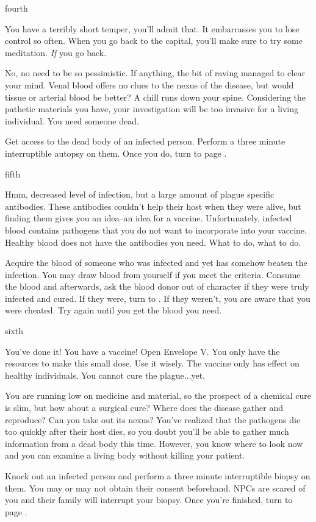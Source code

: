 \documentclass[greennotebook]{Pestilence} %
\begin{document}
\begin{page}{fourth}

You have a terribly short temper, you'll admit that. It embarrasses you to lose control so often. When you go back to the capital, you'll make sure to try some meditation. \textit{If} you go back.

No, no need to be so pessimistic. If anything, the bit of raving managed to clear your mind. Venal blood offers no clues to the nexus of the disease, but would tissue or arterial blood be better? A chill runs down your spine. Considering the pathetic materials you have, your investigation will be too invasive for a living individual. You need someone dead.

Get access to the dead body of an infected person. Perform a three minute interruptible autopsy on them. Once you do, turn to page .

\end{page}

\begin{page}{fifth}

Hmm, decreased level of infection, but a large amount of plague specific antibodies. These antibodies couldn't help their host when they were alive, but finding them gives you an idea--an idea for a vaccine. Unfortunately, infected blood contains pathogens that you do not want to incorporate into your vaccine. Healthy blood does not have the antibodies you need. What to do, what to do.

Acquire the blood of someone who was infected and yet has somehow beaten the infection. You may draw blood from yourself if you meet the criteria. Consume the blood and afterwards, ask the blood donor out of character if they were truly infected and cured. If they were, turn to . If they weren't, you are aware that you were cheated. Try again until you get the blood you need.

\end{page}

\begin{page}{sixth}

You've done it! You have a vaccine! Open Envelope V. You only have the resources to make this small dose. Use it wisely. The vaccine only has effect on healthy individuals. You cannot cure the plague...yet.

You are running low on medicine and material, so the prospect of a chemical cure is slim, but how about a surgical cure? Where does the disease gather and reproduce? Can you take out its nexus? You've realized that the pathogens die too quickly after their host dies, so you doubt you'll be able to gather much information from a dead body this time. However, you know where to look now and you can examine a living body without killing your patient.

Knock out an infected person and perform a three minute interruptible biopsy on them. You may or may not obtain their consent beforehand. NPCs are scared of you and their family will interrupt your biopsy. Once you're finished, turn to page .

\end{page}
\end{document}
